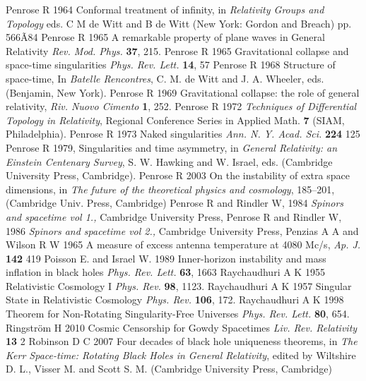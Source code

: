 \documentclass[12pt]{iopart}
\begin{document}
\begin{thebibliography}{999}
 Penrose R 1964 Conformal treatment of infinity, in {\it Relativity Groups and Topology} eds. C M de Witt and
B de Witt (New York: Gordon and Breach) pp. 566Ã84
 Penrose R 1965 A remarkable property of plane waves in General Relativity {\it Rev. Mod. Phys.} {\bf 37}, 215.
 Penrose R 1965 Gravitational 
collapse and space-time singularities {\it Phys. Rev. Lett.} {\bf 14}, 57
 Penrose R 1968 Structure of space-time, In {\it Batelle Rencontres}, C. M. de Witt and J. A. Wheeler, eds. (Benjamin, New York).
 Penrose R 1969 Gravitational collapse: the role of general
relativity,  {\it Riv. Nuovo Cimento} {\bf 1}, 252.%
 Penrose R 1972 {\it Techniques of Differential Topology in
Relativity}, Regional Conference Series in Applied Math. {\bf 7}
(SIAM, Philadelphia).
 Penrose R 1973 Naked singularities {\it Ann. N. Y. Acad. Sci.} {\bf 224} 125%
 Penrose R 1979, Singularities and time asymmetry, in {\it General Relativity: an Einstein
Centenary Survey}, S. W. Hawking and W. Israel, eds.
(Cambridge University Press, Cambridge).%
 Penrose R 2003 On the instability of extra space dimensions, in {\it The future of the theoretical physics and cosmology}, 185--201, (Cambridge Univ. Press, Cambridge)
    Penrose R and Rindler W, 1984
    \textit{Spinors and spacetime vol 1.,}
    Cambridge University Press,
    Penrose R and Rindler W, 1986
    \textit{Spinors and spacetime vol 2.,}
    Cambridge University Press,
 Penzias A A and Wilson R W 1965 A measure of excess antenna temperature at 4080 Mc/s, {\it Ap. J.} {\bf 142} 419
 Poisson E. and Israel W. 1989 Inner-horizon instability and mass inflation in black holes {\it Phys. Rev. Lett.} {\bf 63}, 1663
 Raychaudhuri A K 1955 Relativistic Cosmology I {\it Phys. Rev.} {\bf 98}, 1123.
 Raychaudhuri A K 1957 Singular State in Relativistic Cosmology {\it Phys. Rev.} {\bf 106},
172.%
 Raychaudhuri A K 1998 Theorem for 
Non-Rotating Singularity-Free Universes {\it Phys. Rev. Lett.} {\bf 80}, 654.
 Ringstr\"om H 2010 Cosmic Censorship for Gowdy Spacetimes {\it Liv. Rev. Relativity} {\bf 13} 2
 Robinson D C 2007 Four decades of black hole uniqueness
theorems,  in {\it The Kerr Space-time: Rotating Black Holes in General Relativity}, edited by
Wiltshire D. L., Visser M. and Scott S. M. (Cambridge University Press, Cambridge)

\end{thebibliography}
\end{document}

